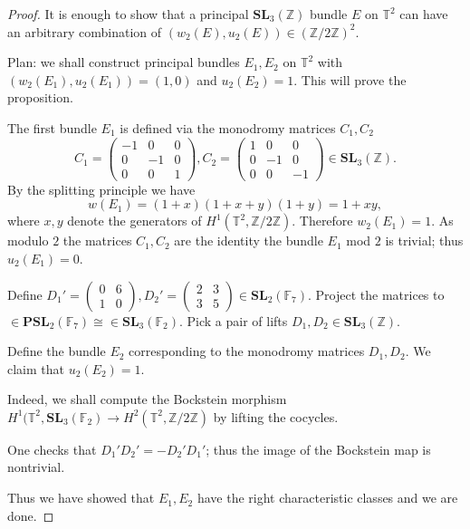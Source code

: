 \documentclass[a4paper]{article}
\newcommand{\SL}{\mathbf{SL}_3(\mathbb{Z})}        %
\begin{document}
\begin{proof}
It is enough to show that a principal $\SL$ bundle $E$ on $\mathbb{T}^2$ can have an arbitrary combination of $(w_2(E), u_2(E)) \in (\mathbb{Z}/ 2\mathbb{Z})^2$.

Plan: we shall construct principal bundles $E_1, E_2$ on $\mathbb{T}^2$ with $(w_2(E_1), u_2(E_1)) = (1, 0)$ and $u_2(E_2) = 1$.
This will prove the proposition.

The first bundle $E_1$ is defined via the monodromy matrices $C_1, C_2$
\[
C_1 = 
\begin{pmatrix}
-1 & 0 & 0 \\
0 & -1 & 0 \\
0 & 0 & 1
\end{pmatrix}
,
C_2 =
\begin{pmatrix}
1 & 0 & 0 \\
0 & -1 & 0 \\
0 & 0 & -1
\end{pmatrix} \in \SL
.\] 
By the splitting principle we have
\[
w(E_1)
= (1 + x) (1 + x + y) (1 + y) 
= 1 + xy
,\] 
where $x, y$ denote the generators of $H^1(\mathbb{T}^2, \mathbb{Z}/ 2 \mathbb{Z})$.
Therefore $w_2(E_1) = 1$.
As modulo $2$ the matrices $C_1, C_2$ are the identity the bundle $E_1$ mod $2$ is trivial; thus $u_2(E_1) = 0$.

Define $D_1' = 
\left( \begin{smallmatrix}0&6\\1&0\end{smallmatrix}\right) 
, D_2' =
\left( \begin{smallmatrix}2&3\\3&5\end{smallmatrix}\right)
\in \mathbf{SL}_2(\mathbb{F}_7)$.
Project the matrices to 
$\in \mathbf{PSL}_2(\mathbb{F}_7) \cong \in \mathbf{SL}_3(\mathbb{F}_2) $.
Pick a pair of lifts $D_1, D_2 \in \mathbf{SL}_3(\mathbb{Z})$.

Define the bundle $E_2$ corresponding to the monodromy matrices $D_1, D_2$. 
We claim that $u_2(E_2) = 1$.

Indeed, we shall compute the Bockstein morphism $H^1(\mathbb{T}^2, \mathbf{SL}_3(\mathbb{F}_2) \to H^2(\mathbb{T}^2, \mathbb{Z}/ 2 \mathbb{Z})$ by lifting the cocycles.

One checks that $D_1' D_2' = - D_2' D_1'$; thus the image of the Bockstein map is nontrivial.

Thus we have showed that $E_1, E_2$ have the right characteristic classes and we are done.
\end{proof}
\end{document}
